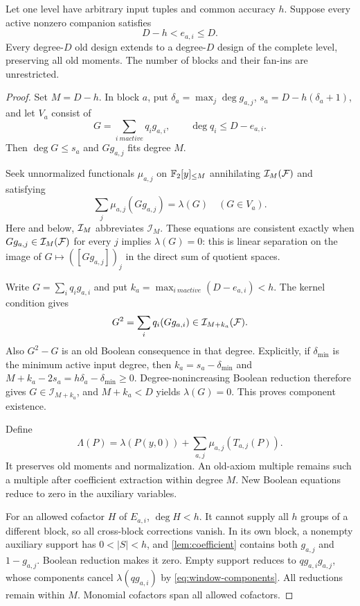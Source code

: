 \begin{theorem}\label{thm:window}
Let one level have arbitrary input tuples and common accuracy $h$. Suppose every active nonzero companion satisfies
\[
 D-h<e_{a,i}\le D.
\]
Every degree-$D$ old design extends to a degree-$D$ design of the complete level, preserving all old moments. The number of blocks and their fan-ins are unrestricted.
\end{theorem}
\begin{proof}
Set $M=D-h$. In block $a$, put $\delta_a=\max_j\deg g_{a,j}$, $s_a=D-h(\delta_a+1)$, and let $V_a$ consist of
\[
 G=\sum_{i\ {
m active}}q_i g_{a,i},\qquad\deg q_i\le D-e_{a,i}.
\]
Then $\deg G\le s_a$ and $Gg_{a,j}$ fits degree $M$.

Seek unnormalized functionals $\mu_{a,j}$ on $\mathbb F_2[y]_{\le M}$ annihilating $\mathcal I_{M}(\mathcal F)$ and satisfying
\begin{equation}\label{eq:window-components}
 \sum_j\mu_{a,j}(Gg_{a,j})=\lambda(G)\quad(G\in V_a).
\end{equation}
Here and below, $\mathcal I_{M}$ abbreviates $\mathcal I_M$. These equations are consistent exactly when $Gg_{a,j}\in\mathcal I_{M}(\mathcal F)$ for every $j$ implies $\lambda(G)=0$: this is linear separation on the image of $G\mapsto([Gg_{a,j}])_j$ in the direct sum of quotient spaces.

Write $G=\sum_iq_ig_{a,i}$ and put $k_a=\max_{i\ {
m active}}(D-e_{a,i})<h$. The kernel condition gives
\[
 G^2=\sum_iq_i(Gg_{a,i})\in\mathcal I_{M+k_a}(\mathcal F).
\]
Also $G^2-G$ is an old Boolean consequence in that degree. Explicitly, if $\delta_{\min}$ is the minimum active input degree, then $k_a=s_a-\delta_{\min}$ and
$M+k_a-2s_a=h\delta_a-\delta_{\min}\ge0$.
Degree-nonincreasing Boolean reduction therefore gives $G\in\mathcal I_{M+k_a}$, and $M+k_a<D$ yields $\lambda(G)=0$. This proves component existence.

Define
\[
 \Lambda(P)=\lambda(P(y,0))+\sum_{a,j}\mu_{a,j}(T_{a,j}(P)).
\]
It preserves old moments and normalization. An old-axiom multiple remains such a multiple after coefficient extraction within degree $M$. New Boolean equations reduce to zero in the auxiliary variables.

For an allowed cofactor $H$ of $E_{a,i}$, $\deg H<h$. It cannot supply all $h$ groups of a different block, so all cross-block corrections vanish. In its own block, a nonempty auxiliary support has $0<|S|<h$, and \cref{lem:coefficient} contains both $g_{a,j}$ and $1-g_{a,j}$. Boolean reduction makes it zero. Empty support reduces to $qg_{a,i}g_{a,j}$, whose components cancel $\lambda(qg_{a,i})$ by \eqref{eq:window-components}. All reductions remain within $M$. Monomial cofactors span all allowed cofactors.
\end{proof}

